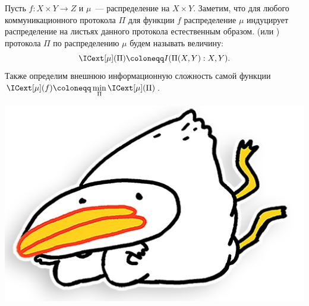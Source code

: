 







\begin{definition*}
    Пусть $f\colon X \times Y \to Z$ и $\mu$~--- распределение на $X \times Y$. Заметим, что для любого
    коммуникационного протокола $\Pi$ для функции $f$ распределение $\mu$ индуцирует распределение на
    листьях данного протокола естественным образом.  (или
    ) протокола $\Pi$ по распределению $\mu$ будем называть
    величину:
    $$\ICext[\mu](\Pi) \coloneqq I(\Pi(X, Y) : X, Y).$$
    Также определим внешнюю информационную сложность самой функции
    $\ICext[\mu](f) \coloneqq \min\limits_{\Pi} \ICext[\mu](\Pi)$.
\end{definition*}


\vspace{0.2cm}
\begin{center}
    \includegraphics[scale = 0.2]{../pics/utia-rest.png}    
\end{center}






